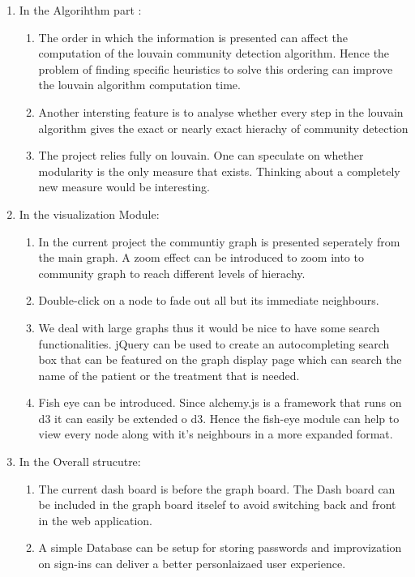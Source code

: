 \begin{enumerate}
\item In the Algorihthm part :
\begin{enumerate}
\item The order in which the information is presented can affect the computation of the louvain community detection algorithm. Hence the problem of finding specific heuristics to solve this ordering can improve the louvain algorithm computation time.
\item Another intersting feature is to analyse whether every step in the louvain algorithm gives the exact or nearly exact hierachy of community detection
\item 
The project relies fully on louvain. One can speculate on whether modularity is the only measure that exists. Thinking about a completely new measure would be interesting. 
\end{enumerate}

\item In the visualization Module:
\begin{enumerate}
\item In the current project the communtiy graph is presented seperately from the main graph.  A zoom effect can be introduced to zoom into to community graph to reach different levels of hierachy. 
\item  Double-click on a node to fade out all but its immediate neighbours.
\item We deal with large graphs thus it would be nice to have some search functionalities. jQuery can be used to create an autocompleting search box that can be featured on the graph display page which can search the name of the patient or the treatment that is needed. 
\item Fish eye can be introduced. Since alchemy.js is a framework that runs on d3 it can easily be extended o d3. Hence the fish-eye module can help to view every node along  with it's neighbours in a more expanded format.
\end{enumerate}
\item In the Overall strucutre:
\begin{enumerate}
\item The current dash board is before the graph board. The Dash board can be included in the graph board itselef to avoid switching back and front in the web application.
\item  A simple Database  can be setup for storing passwords and improvization on sign-ins can deliver a better personlaizaed user experience.
\end{enumerate}
\end{enumerate}
